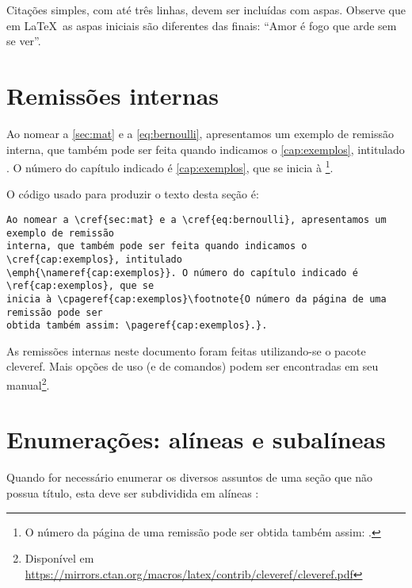 Citações simples, com até três linhas, devem ser incluídas com aspas. Observe que em \LaTeX\ as aspas iniciais são diferentes das finais: ``Amor é fogo que arde sem se ver''.

\section{Remissões internas}

Ao nomear a \cref{sec:mat} e a \cref{eq:bernoulli}, apresentamos um exemplo de remissão interna, que também pode ser feita quando indicamos o \cref{cap:exemplos}, intitulado \emph{}. O número do capítulo indicado é \ref{cap:exemplos}, que se inicia à \footnote{O número da página de uma remissão pode ser obtida também assim: \pageref{cap:exemplos}.}.

O código usado para produzir o texto desta seção é:
\begin{verbatim}
Ao nomear a \cref{sec:mat} e a \cref{eq:bernoulli}, apresentamos um exemplo de remissão
interna, que também pode ser feita quando indicamos o \cref{cap:exemplos}, intitulado
\emph{\nameref{cap:exemplos}}. O número do capítulo indicado é \ref{cap:exemplos}, que se
inicia à \cpageref{cap:exemplos}\footnote{O número da página de uma remissão pode ser
obtida também assim: \pageref{cap:exemplos}.}.
\end{verbatim}

As remissões internas neste documento foram feitas utilizando-se o pacote \textsf{cleveref}. Mais opções de uso (e de comandos) podem ser encontradas em seu manual\footnote{Disponível em \url{https://mirrors.ctan.org/macros/latex/contrib/cleveref/cleveref.pdf}}.

\section{Enumerações: alíneas e subalíneas}

Quando for necessário enumerar os diversos assuntos de uma seção que não possua título, esta deve ser
subdividida em alíneas \cite[seção 4.2]{NBR6024:2012}:

